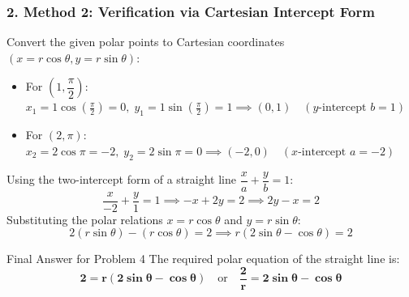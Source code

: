 \documentclass[11pt,a4paper]{article}
\begin{document}
\begin{center}
\end{center}
\vspace{-3mm}

\subsubsection*{2. Method 2: Verification via Cartesian Intercept Form}
Convert the given polar points to Cartesian coordinates $(x = r\cos\theta, y = r\sin\theta)$:
\begin{itemize}\setlength{\itemsep}{1.5pt}
    \item For $\left(1, \dfrac{\pi}{2}\right)$: $x_1 = 1\cos\left(\frac{\pi}{2}\right) = 0, \; y_1 = 1\sin\left(\frac{\pi}{2}\right) = 1 \implies (0, 1) \quad (\text{$y$-intercept } b = 1)$
    \item For $(2, \pi)$: $x_2 = 2\cos\pi = -2, \; y_2 = 2\sin\pi = 0 \implies (-2, 0) \quad (\text{$x$-intercept } a = -2)$
\end{itemize}
Using the two-intercept form of a straight line $\dfrac{x}{a} + \dfrac{y}{b} = 1$:
\[
\frac{x}{-2} + \frac{y}{1} = 1 \implies -x + 2y = 2 \implies 2y - x = 2
\]
Substituting the polar relations $x = r\cos\theta$ and $y = r\sin\theta$:
\[
2(r\sin\theta) - (r\cos\theta) = 2 \implies r(2\sin\theta - \cos\theta) = 2
\]

\vspace{3mm}
\noindent
\begin{ansbox}{Final Answer for Problem 4}
The required polar equation of the straight line is:
\[
\mathbf{2 = r(2\sin\theta - \cos\theta)} \quad \text{or} \quad \mathbf{\frac{2}{r} = 2\sin\theta - \cos\theta}
\]
\end{ansbox}
\end{document}
